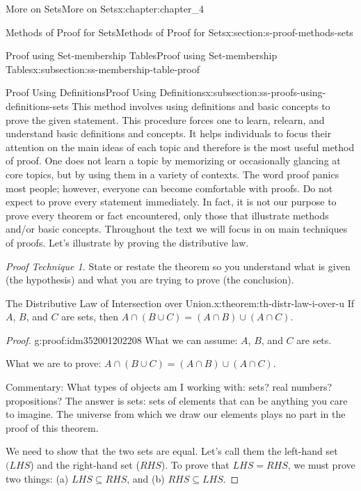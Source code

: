 \documentclass[oneside,10pt,]{book}
\begin{document}
\begin{chapterptx}{More on Sets}{}{More on Sets}{}{}{x:chapter:chapter_4}
\begin{sectionptx}{Methods of Proof for Sets}{}{Methods of Proof for Sets}{}{}{x:section:s-proof-methods-sets}
\begin{subsectionptx}{Proof using Set-membership Tables}{}{Proof using Set-membership Tables}{}{}{x:subsection:ss-membership-table-proof}
\end{subsectionptx}
%
%
\typeout{************************************************}
\typeout{************************************************}
%
\begin{subsectionptx}{Proof Using Definitions}{}{Proof Using Definitions}{}{}{x:subsection:ss-proofs-using-definitions-sets}
This method involves using definitions and basic concepts to prove the given statement. This procedure forces one to learn, relearn, and understand basic definitions and concepts. It helps individuals to focus their attention on the main ideas of each topic and therefore is the most useful method of proof. One does not learn a topic by memorizing or occasionally glancing at core topics, but by using them in a variety of contexts. The word proof panics most people; however, everyone can become comfortable with proofs. Do not expect to prove every statement immediately. In fact, it is not our purpose to prove every theorem or fact encountered, only those that illustrate methods and\slash{}or basic concepts. Throughout the text we will focus in on main techniques of proofs. Let's illustrate by proving the distributive law.%
\par
\emph{Proof Technique 1.}  State or restate the theorem so you understand what is given (the hypothesis) and what you are trying to prove (the conclusion).%
\begin{theorem}{The Distributive Law of Intersection over Union.}{}{x:theorem:th-distr-law-i-over-u}%
If \(A\), \(B\), and \(C\) are sets, then \(A\cap  (B \cup  C) = (A\cap B) \cup  (A \cap  C)\).%
\end{theorem}
\begin{proof}{}{g:proof:idm352001202208}
What we can assume: \(A\), \(B\), and \(C\) are sets.%
\par
What we are to prove: \(A\cap  (B \cup  C) = (A\cap B) \cup  (A \cap  C)\).%
\par
Commentary: What types of objects am I working with: sets? real numbers? propositions? The answer is sets: sets of elements that can be anything you care to imagine. The universe from which we draw our elements plays no part in the proof of this theorem.%
\par
We need to show that the two sets are equal. Let's call them the left-hand set \((LHS\)) and the right-hand set (\(RHS\)). To prove that \(LHS = RHS\), we must prove two things: (a) \(LHS\subseteq RHS\), and (b) \(RHS \subseteq LHS\).%
\par

\end{proof}
\end{subsectionptx}
\end{sectionptx}
\end{chapterptx}
\end{document}
